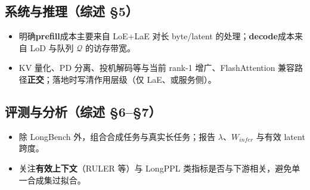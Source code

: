 \documentclass[a4paper,11pt]{article}
\begin{document}
\subsection*{系统与推理（综述 \S5）}
\begin{itemize}
    \item 明确\textbf{prefill}成本主要来自 LoE+LaE 对长 byte/latent 的处理；\textbf{decode}成本来自 LoD 与队列 $\mathcal{Q}$ 的访存带宽。
    \item KV 量化、PD 分离、投机解码等与当前 rank-1 增广、FlashAttention 兼容路径\textbf{正交}；落地时写清作用层级（仅 LaE、或服务侧）。
\end{itemize}

\subsection*{评测与分析（综述 \S6--\S7）}
\begin{itemize}
    \item 除 LongBench 外，组合合成任务与真实长任务；报告 $\lambda$、$W_{infer}$ 与有效 latent 跨度。
    \item 关注\textbf{有效上下文}（RULER 等）与 LongPPL 类指标是否与下游相关，避免单一合成集过拟合。
\end{itemize}
\end{document}
